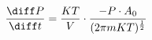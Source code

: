 \begin{eqnarray*}
  \frac{
  \diff P
  }{
  \diff t
  }
  =
  \frac{
  KT
  }{
  V
  }
  \cdot
  \frac{
    -P
    \cdot
    A_0      
  }{
    (
      2 \pi m K T
      )^{\frac{1}{2}}
  }
\label{}
\end{eqnarray*}
